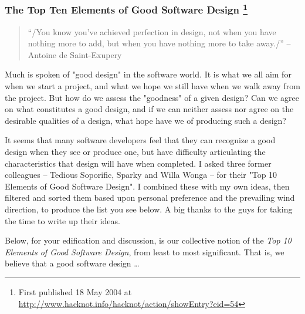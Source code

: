 \documentclass{article}
\begin{document}
\subsubsection{The Top Ten Elements of Good Software Design \footnote{First published 18 May 2004 at
\url{http://www.hacknot.info/hacknot/action/showEntry?eid=54}}}
\label{sec:orgheadline247}

\begin{quote}
“/You know you've achieved perfection in design, not when you have
nothing more to add, but when you have nothing more to take away./” --
Antoine de Saint-Exupery
\end{quote}

Much is spoken of "good design" in the software world. It is what we all
aim for when we start a project, and what we hope we still have when we
walk away from the project. But how do we assess the "goodness" of a
given design? Can we agree on what constitutes a good design, and if we
can neither assess nor agree on the desirable qualities of a design,
what hope have we of producing such a design?

It seems that many software developers feel that they can recognize a
good design when they see or produce one, but have difficulty
articulating the characteristics that design will have when completed. I
asked three former colleagues -- Tedious Soporific, Sparky and Willa
Wonga -- for their "Top 10 Elements of Good Software Design". I combined
these with my own ideas, then filtered and sorted them based upon
personal preference and the prevailing wind direction, to produce the
list you see below. A big thanks to the guys for taking the time to
write up their ideas.

Below, for your edification and discussion, is our collective notion of
the \emph{Top 10 Elements of Good Software Design}, from least to most
significant. That is, we believe that a good software design \ldots{}
\end{document}

